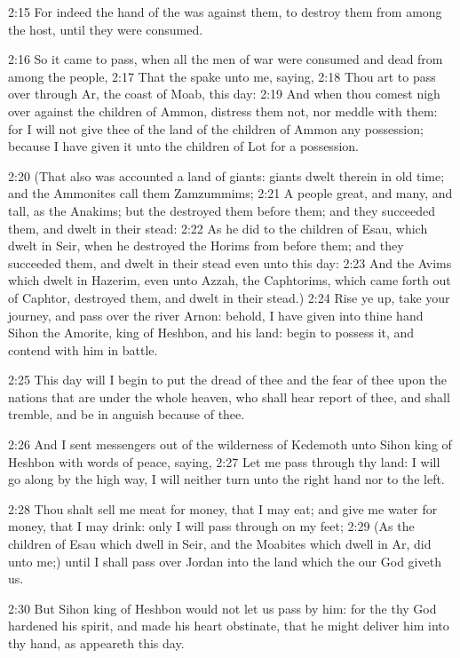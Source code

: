 2:15 For indeed the hand of the \LORD was against them, to destroy them from among the host, until they were consumed.

2:16 So it came to pass, when all the men of war were consumed and dead from among the people, 2:17 That the \LORD spake unto me, saying, 2:18 Thou art to pass over through Ar, the coast of Moab, this day: 2:19 And when thou comest nigh over against the children of Ammon, distress them not, nor meddle with them: for I will not give thee of the land of the children of Ammon any possession; because I have given it unto the children of Lot for a possession.

2:20 (That also was accounted a land of giants: giants dwelt therein in old time; and the Ammonites call them Zamzummims; 2:21 A people great, and many, and tall, as the Anakims; but the \LORD destroyed them before them; and they succeeded them, and dwelt in their stead: 2:22 As he did to the children of Esau, which dwelt in Seir, when he destroyed the Horims from before them; and they succeeded them, and dwelt in their stead even unto this day: 2:23 And the Avims which dwelt in Hazerim, even unto Azzah, the Caphtorims, which came forth out of Caphtor, destroyed them, and dwelt in their stead.)  2:24 Rise ye up, take your journey, and pass over the river Arnon: behold, I have given into thine hand Sihon the Amorite, king of Heshbon, and his land: begin to possess it, and contend with him in battle.

2:25 This day will I begin to put the dread of thee and the fear of thee upon the nations that are under the whole heaven, who shall hear report of thee, and shall tremble, and be in anguish because of thee.

2:26 And I sent messengers out of the wilderness of Kedemoth unto Sihon king of Heshbon with words of peace, saying, 2:27 Let me pass through thy land: I will go along by the high way, I will neither turn unto the right hand nor to the left.

2:28 Thou shalt sell me meat for money, that I may eat; and give me water for money, that I may drink: only I will pass through on my feet; 2:29 (As the children of Esau which dwell in Seir, and the Moabites which dwell in Ar, did unto me;) until I shall pass over Jordan into the land which the \LORD our God giveth us.

2:30 But Sihon king of Heshbon would not let us pass by him: for the \LORD thy God hardened his spirit, and made his heart obstinate, that he might deliver him into thy hand, as appeareth this day.

